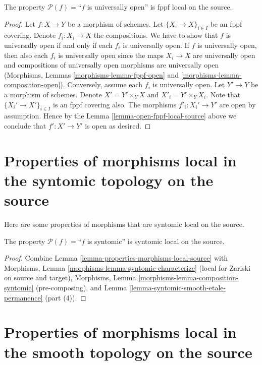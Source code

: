\begin{lemma}
\label{lemma-universally-open-fppf-local-source}
The property $\mathcal{P}(f)=$``$f$ is universally open''
is fppf local on the source.
\end{lemma}

\begin{proof}
Let $f : X \to Y$ be a morphism of schemes.
Let $\{X_i \to X\}_{i \in I}$ be an fppf covering.
Denote $f_i : X_i \to X$ the compositions.
We have to show that $f$ is universally open if and only if
each $f_i$ is universally open. If $f$ is universally open,
then also each $f_i$ is universally open since the maps
$X_i \to X$ are universally open and compositions
of universally open morphisms are universally open
(Morphisms, Lemmas \ref{morphisms-lemma-fppf-open}
and \ref{morphisms-lemma-composition-open}).
Conversely, assume each $f_i$ is universally open.
Let $Y' \to Y$ be a morphism of schemes.
Denote $X' = Y' \times_Y X$ and $X'_i = Y' \times_Y X_i$.
Note that $\{X_i' \to X'\}_{i \in I}$ is an fppf covering also.
The morphisms $f'_i : X_i' \to Y'$ are open by assumption.
Hence by the Lemma \ref{lemma-open-fppf-local-source}
above we conclude that $f' : X' \to Y'$ is open as desired.
\end{proof}



\section{Properties of morphisms local in the syntomic topology on the source}
\label{section-syntomic-local-source}

\noindent
Here are some properties of morphisms that are syntomic local on the source.

\begin{lemma}
\label{lemma-syntomic-syntomic-local-source}
The property $\mathcal{P}(f)=$``$f$ is syntomic''
is syntomic local on the source.
\end{lemma}

\begin{proof}
Combine Lemma \ref{lemma-properties-morphisms-local-source} with
Morphisms, Lemma \ref{morphisms-lemma-syntomic-characterize}
(local for Zariski on source and target),
Morphisms, Lemma \ref{morphisms-lemma-composition-syntomic} (pre-composing),
and Lemma \ref{lemma-syntomic-smooth-etale-permanence} (part (4)).
\end{proof}




\section{Properties of morphisms local in the smooth topology on the source}
\label{section-smooth-local-source}

